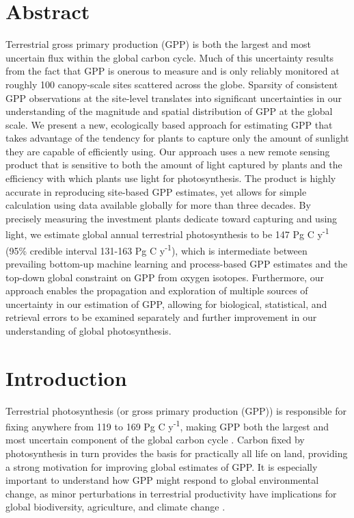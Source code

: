 \documentclass[10pt,letterpaper]{article}
\begin{document}
\section*{Abstract}
Terrestrial gross primary production (GPP) is both the largest and most uncertain flux within the global carbon cycle. Much of this uncertainty results from the fact that GPP is onerous to measure and is only reliably monitored at roughly 100 canopy-scale sites scattered across the globe. Sparsity of consistent GPP observations at the site-level translates into significant uncertainties in our understanding of the magnitude and spatial distribution of GPP at the global scale. We present a new, ecologically based approach for estimating GPP that takes advantage of the tendency for plants to capture only the amount of sunlight they are capable of efficiently using. Our approach uses a new remote sensing product that is sensitive to both the amount of light captured by plants and the efficiency with which plants use light for photosynthesis. The product is highly accurate in reproducing site-based GPP estimates, yet allows for simple calculation using data available globally for more than three decades. By precisely measuring the investment plants dedicate toward capturing and using light, we estimate global annual terrestrial photosynthesis to be 147 Pg C y\textsuperscript{-1} (95\% credible interval 131-163 Pg C y\textsuperscript{-1}), which is intermediate between prevailing bottom-up machine learning and process-based GPP estimates and the top-down global constraint on GPP from oxygen isotopes. Furthermore, our approach enables the propagation and exploration of multiple sources of uncertainty in our estimation of GPP, allowing for biological, statistical, and retrieval errors to be examined separately and further improvement in our understanding of global photosynthesis.

\section*{Introduction}
Terrestrial photosynthesis (or gross primary production (GPP)) is responsible for fixing anywhere from 119 to 169 Pg C y\textsuperscript{-1}, making GPP both the largest and most uncertain component of the global carbon cycle \cite{Anav2015}. Carbon fixed by photosynthesis in turn provides the basis for practically all life on land, providing a strong motivation for improving global estimates of GPP. It is especially important to understand how GPP might respond to global environmental change, as minor perturbations in terrestrial productivity have implications for global biodiversity, agriculture, and climate change \cite{rockstrom2009safe, running2012measurable}.
\end{document}
